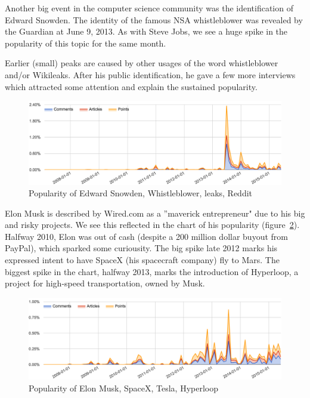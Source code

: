 Another big event in the computer science community was the identification of Edward Snowden. The identity of the famous NSA whistleblower was revealed by the Guardian at June 9, 2013. As with Steve Jobs, we see a huge spike in the popularity of this topic for the same month.

Earlier (small) peaks are caused by other usages of the word whistleblower and/or Wikileaks. After his public identification, he gave a few more interviews which attracted some attention and explain the sustained popularity.
\begin{figure}[H] %
	\caption{Popularity of Edward Snowden, Whistleblower, leaks, Reddit}
	\label{fig:trend_snowden}
	\centering
	\includegraphics[width=14cm]{topic_trends/snowden_relative}
\end{figure}
\pagebreak
Elon Musk is described by Wired.com as a ''maverick entrepreneur" due to his big and risky projects. We see this reflected in the chart of his popularity (figure~\ref{fig:trend_elon}). Halfway 2010, Elon was out of cash (despite a 200 million dollar buyout from PayPal), which sparked some curiousity. The big spike late 2012 marks his expressed intent to have SpaceX (his spacecraft company) fly to Mars. The biggest spike in the chart, halfway 2013, marks the introduction of Hyperloop, a project for high-speed transportation, owned by Musk.
\begin{figure}[H] %
	\caption{Popularity of Elon Musk, SpaceX, Tesla, Hyperloop}
	\label{fig:trend_elon}
	\centering
	\includegraphics[width=14cm]{topic_trends/elon_relative}
\end{figure}

